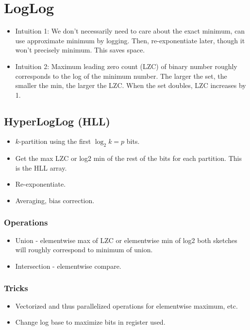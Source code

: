 \documentclass{article}
\begin{document}
\section*{LogLog}
\begin{itemize}
    \item Intuition 1: We don't necessarily need to care about the exact minimum, can use approximate minimum by logging. Then, re-exponentiate later, though it won't precisely minimum. This saves space.
    \item Intuition 2: Maximum leading zero count (LZC) of binary number roughly corresponds to the log of the minimum number. The larger the set, the smaller the min, the larger the LZC. When the set doubles, LZC increases by 1.
\end{itemize}{}

\subsection*{HyperLogLog (HLL)}
\begin{itemize}
    \item $k$-partition using the first $\log_2 k=p$ bits.
    \item Get the max LZC or log2 min of the rest of the bits for each partition. This is the HLL array.
    \item Re-exponentiate.
    \item Averaging, bias correction.
\end{itemize}
\subsubsection*{Operations}
\begin{itemize}
    \item Union - elementwise max of LZC or elementwise min of log2 both sketches will roughly correspond to minimum of union.
    \item Intersection - elementwise compare.
\end{itemize}{}
\subsubsection*{Tricks}
\begin{itemize}
    \item Vectorized and thus parallelized operations for elementwise maximum, etc.
    \item Change log base to maximize bits in register used.
\end{itemize}{}
\end{document}
